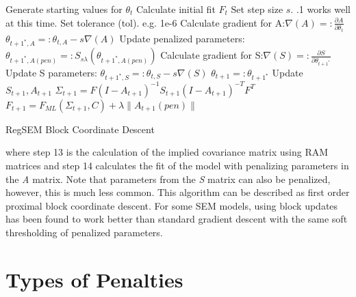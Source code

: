 \documentclass[article]{jss}
\begin{document}
\begin{minipage}{\textwidth}
    \begin{algorithm}[H]
        \begin{algorithmic}[1]
            \State Generate starting values for $\theta_{t}$
            \State Calculate initial fit $F_{t}$
            \State Set step size $s$. .1 works well at this time.
            \State Set tolerance (tol). e.g. 1e-6
            \State Calculate gradient for A:$ \nabla (A) =:  \frac{\partial A}{\partial \theta_{t}}$
            \State $ \theta_{t+1^{*},A} =: \theta_{t,A} - s \nabla(A)$
            \State  Update penalized parameters: $\theta_{t+1^{*},A(pen)} =: S_{s \lambda}(\theta_{t+1^{*},A(pen)})$
            \State Calculate gradient for S:$ \nabla (S) =:  \frac{\partial S}{\partial \theta_{t+1^{*}}}$ 
            \State Update S parameters: $ \theta_{t+1^{*},S} =: \theta_{t,S} - s \nabla(S)$
            \State $\theta_{t+1} =: \theta_{t+1^{*}}$ %
            \State Update $S_{t+1}, A_{t+1}$
            \State $ \Sigma_{t+1} = F(I-A_{t+1})^{-1}S_{t+1}(I-A_{t+1})^{-T}F^{T}$
            \State $ F_{t+1} = F_{ML}(\Sigma_{t+1},C) + \lambda \| A_{t+1}(pen) \|$
            \EndWhile
        \end{algorithmic}
        \caption{RegSEM Block Coordinate Descent}
        \label{alg:seq}
    \end{algorithm}
\end{minipage}

\noindent
where step 13 is the calculation of the implied covariance matrix using
RAM matrices and step 14 calculates the fit of the model with penalizing
parameters in the \textit{A} matrix. Note that parameters from the
\textit{S} matrix can also be penalized, however, this is much less
common. This algorithm can be described as first order proximal block
coordinate descent. For some SEM models, using block updates has been
found to work better than standard gradient descent with the same soft
thresholding of penalized parameters.

\section{Types of Penalties}\label{types-of-penalties}
\end{document}
